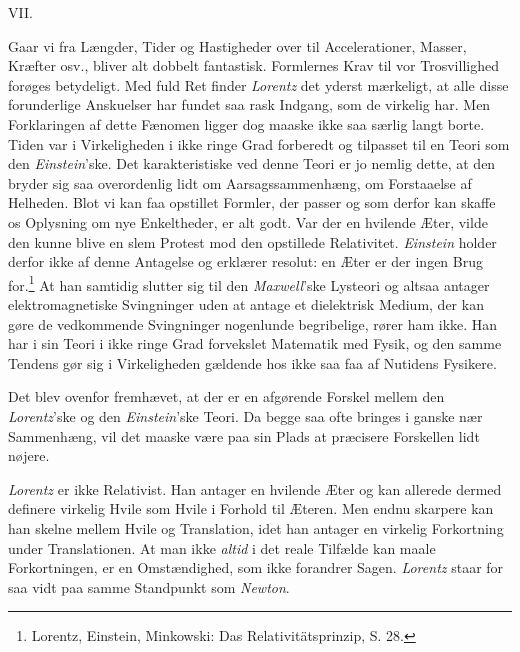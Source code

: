 \documentclass[12pt,a4paper]{article}
\newcommand{\opage}[1]{\marginnote{\footnotesize\textit{[#1]}}}
\begin{document}
\begin{center}
VII.
\end{center}

Gaar vi fra Længder, Tider og Hastigheder over til Accelerationer, Masser,
Kræfter osv., bliver alt dobbelt fantastisk. Formlernes Krav til vor
Trosvillighed forøges betydeligt. Med fuld Ret finder \emph{Lorentz} det
yderst mærkeligt, at alle disse forunderlige Anskuelser har fundet saa rask
Indgang, som de virkelig har. Men Forklaringen af dette Fænomen ligger dog
maaske ikke saa særlig langt borte. Tiden var i Virkeligheden i ikke ringe Grad
forberedt og tilpasset til en Teori som den \emph{Einstein}'ske. Det
karakteristiske ved denne Teori er jo nemlig dette, at den bryder sig saa
overordenlig lidt om Aarsagssammenhæng, om Forstaaelse af Helheden. Blot vi kan
faa opstillet Formler, \guillemotleft der passer\guillemotright{} og som derfor
kan skaffe os Oplysning om nye Enkeltheder, er alt godt. Var der en hvilende
Æter, vilde den kunne blive en slem Protest mod den opstillede Relativitet.
\emph{Einstein} holder derfor ikke af denne Antagelse og erklærer resolut: en
Æter er der ingen Brug for.\footnote{Lorentz, Einstein, Minkowski: Das
Relativitätsprinzip, S. 28.} At han samtidig slutter sig til den
\emph{Maxwell}'ske Lysteori og altsaa antager elektromagnetiske Svingninger
uden at antage et dielektrisk Medium, der kan gøre de vedkommende Svingninger
nogenlunde begribelige, rører ham ikke. Han har i sin Teori i ikke ringe Grad
forvekslet Matematik med Fysik, og den samme Tendens gør sig i Virkeligheden
gældende hos ikke saa faa af Nutidens Fysikere.

Det blev ovenfor fremhævet, at der er en afgørende Forskel mellem den
\emph{Lorentz}'ske og den \emph{Einstein}'ske Teori. Da begge saa ofte bringes
i ganske nær Sammenhæng, vil det maaske være paa sin Plads at præcisere
Forskellen lidt nøjere.

\opage{30} \emph{Lorentz} er ikke Relativist. Han antager en hvilende Æter og kan allerede
dermed definere virkelig Hvile som Hvile i Forhold til Æteren. Men endnu
skarpere kan han skelne mellem Hvile og Translation, idet han antager en
virkelig Forkortning under Translationen. At man ikke \emph{altid} i det reale
Tilfælde kan maale Forkortningen, er en Omstændighed, som ikke forandrer Sagen.
\emph{Lorentz} staar for saa vidt paa samme Standpunkt som \emph{Newton}.
\end{document}
